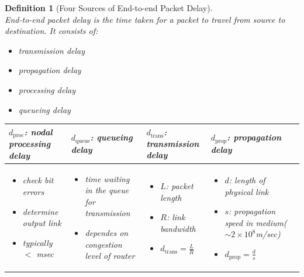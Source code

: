 \documentclass[12pt]{article}
\newtheorem{definition}{Definition}[section]
\theoremstyle{definition}
\begin{document}
\begin{definition}[Four Sources of End-to-end Packet Delay]
\hfill\\\normalfont 
End-to-end packet delay is the time taken for a packet to travel from source to destination. It consists of:
\begin{itemize}
  \item transmission delay
  \item propagation delay
  \item processing delay
  \item queueing delay
\end{itemize}
\begin{table}[h]
\hspace{-4em}
\begin{tabular}{|p{5.5cm}|p{4cm}|p{4.5cm}|p{4.5cm}|}
\hline
$d_\text{proc}$: nodal processing delay&$d_\text{queue}$: queueing delay&$d_\text{trans}$: transmission delay&$d_\text{prop}$: propagation delay\\\hline
\begin{itemize}[leftmargin=3mm]
  \item check bit errors
  \item determine output link
  \item typically $<$ msec
\end{itemize}&
\begin{itemize}[leftmargin=3mm]
  \item time waiting in the queue for transmission
  \item dependes on congestion level of router
\end{itemize}&
\begin{itemize}[leftmargin=3mm]
  \item $L$: packet length
  \item $R$: link bandwidth
  \item $d_\text{trans} = \frac{L}{R}$
\end{itemize}&
\begin{itemize}[leftmargin=3mm]
  \item $d$: length of physical link
  \item $s$: propagation speed in medium\newline($\sim 2\times 10^8$m/sec)
  \item $d_\text{prop} = \frac{d}{s}$
\end{itemize}
\\\hline
\end{tabular}
\end{table}
\end{definition}
\end{document}
